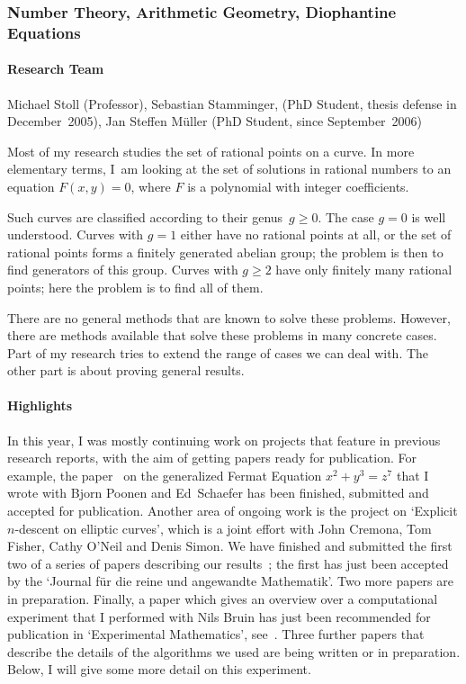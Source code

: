 \subsubsection{Number Theory, Arithmetic Geometry, Diophantine Equations}

\paragraph{Research Team}

Michael Stoll (Professor),
Sebastian Stamminger, (PhD Student, thesis defense in December~2005),
Jan Steffen M\"uller (PhD Student, since September~2006)

\medskip

Most of my research studies the set of
rational points on a curve.  In more elementary terms, I~am looking at the set
of solutions in rational numbers to an equation $F(x, y) = 0$, where
$F$ is a polynomial with integer coefficients.

Such curves are classified according to their genus~$g \ge 0$.
The case $g = 0$ is well understood.
Curves with $g = 1$ either have no rational points at all,  or the set of
rational points forms a finitely generated abelian group;
the problem is then to find generators of this group. Curves
with  $g \ge 2$ have only  finitely many rational points; here the
problem is to find all of them.

There are no general methods that are known to solve these problems.
However, there are methods available that solve these problems in
many concrete cases. Part of my  research tries to extend the range
of cases we can deal with. The other part is about proving general
results.


\paragraph{Highlights}


In this year, I was mostly continuing work on projects that feature in
previous research reports, with the aim of getting papers ready for
publication. For example, the paper~\cite{Stoll2} on the generalized
Fermat Equation $x^2 + y^3 = z^7$ that I wrote with Bjorn Poonen and
Ed~Schaefer has been finished, submitted and accepted for publication.
Another area of ongoing work is the project on `Explicit $n$-descent
on elliptic curves', which is a joint effort with John Cremona, Tom
Fisher, Cathy O'Neil and Denis Simon. We have finished and submitted
the first two of a series of papers describing our
results~\cite{StollandCFOS1,StollandCFOS2}; the first has just been
accepted by the `Journal f\"ur die reine und angewandte Mathematik'.
Two more papers
are in preparation. Finally, a paper which gives an overview over a
computational experiment that I performed with Nils Bruin has just been
recommended for publication in `Experimental Mathematics',
see~\cite{Stoll4}. Three further papers that describe the details of the
algorithms we used are being written or in preparation. Below,
I will give some more detail on this experiment.

